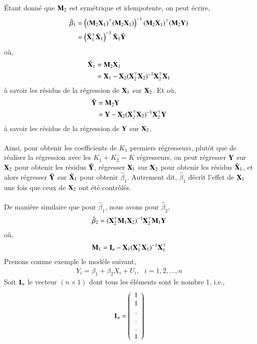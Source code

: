\documentclass[10pt, reqno]{amsart}
\begin{document}
\'Etant donné que $\mathbf M_2$ est symétrique et idempotente, on peut écrire,
\begin{align*}
\hat{\beta}_1 &= \left((\mathbf M_2\mathbf X_1)^\top(\mathbf M_2\mathbf X_1)\right)^{-1}
(\mathbf M_2\mathbf X_1)^\top(\mathbf M_2\mathbf Y)\\
&=\left(\tilde{\mathbf X}_1^\top\tilde{\mathbf X}_1\right)^{-1}\tilde{\mathbf X}_1\tilde{\mathbf Y}
\end{align*}
où,
\begin{align*}
\tilde{\mathbf X}_1&=\mathbf M_2\mathbf X_1\\
&= \mathbf X_1 - \mathbf X_2(\mathbf X_2^\top\mathbf X_2)^{-1}\mathbf X_2^\top\mathbf X_1
\end{align*}
à savoir les résidus de la régression de $\mathbf X_1$ sur $\mathbf X_2$. Et où,
\begin{align*}
\tilde{\mathbf Y}&=\mathbf M_2\mathbf Y\\
&= \mathbf Y - \mathbf X_2(\mathbf X_2^\top\mathbf X_2)^{-1}\mathbf X_2^\top\mathbf Y
\end{align*}
à savoir les résidus de la régression de $\mathbf Y$ sur $\mathbf X_2$.\\\\
Ainsi, pour obtenir les coefficients de $K_1$ premiers régresseurs, plutôt que de réaliser la régression avec les $K_1+K_2 =K$ régresseurs, on peut régresser $\mathbf Y$ sur $\mathbf X_2$ pour obtenir les résidus $\tilde{\mathbf Y}$, régresser $\mathbf X_1$ sur $\mathbf X_2$ pour obtenir les résidus $\tilde{\mathbf X}_1$, et alors régresser $\tilde{\mathbf Y}$ sur $\tilde{\mathbf X}_1$ pour obtenir $\hat{\beta}_1$. Autrement dit, $\hat{\beta}_1$ décrit l'effet de $\mathbf X_1$ une fois que ceux de $\mathbf X_2$ ont été contrôlés.\\\\
De manière similaire que pour $\hat{\beta}_1$, nous avons pour $\hat{\beta}_2$,
\begin{align*}
\hat{\beta}_2 = (\mathbf X_2^\top\mathbf M_1\mathbf X_2)^{-1} \mathbf X_2^\top\mathbf M_1\mathbf Y
\end{align*}
où,
\begin{align*}
\mathbf M_1 = \mathbf{I}_n - \mathbf X_1(\mathbf X_1^\top\mathbf X_1)^{-1}\mathbf X_1^\top
\end{align*}
Prenons comme exemple le modèle suivant,
\begin{align*}
Y_i = \beta_1 + \beta_2 X_i + U_i, \ \ \ i = 1,2,...,n
\end{align*}
Soit $\mathbf{1}_n$  le vecteur $(n\times 1)$ dont tous les éléments sont le nombre 1, i.e.,
\begin{align*}
\mathbf{1}_n =
\left(
\begin{array}{c}
1\\
1\\
.\\
.\\
.\\
1
\end{array}
\right)
\end{align*}
\end{document}
